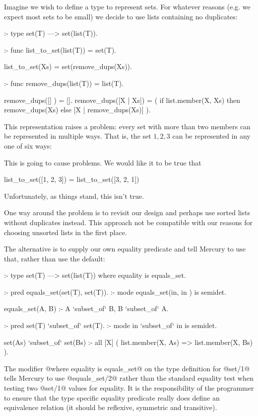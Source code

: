 Imagine we wish to define a type to represent sets.  For whatever reasons
(e.g. we expect most sets to be small) we decide to use lists containing no
duplicates:
\begin{myverbatim}
:- type set(T) ---> set(list(T)).   %

:- func list_to_set(list(T)) = set(T).

list_to_set(Xs) = set(remove_dups(Xs)).

:- func remove_dups(list(T)) = list(T).

remove_dups([]      ) = [].
remove_dups([X | Xs]) =
    ( if list.member(X, Xs) then remove_dups(Xs)
                            else [X | remove_dups(Xs)] ).
\end{myverbatim}
This representation raises a problem: every set with more than two members
can be represented in multiple ways.  That is, the set ${1, 2, 3}$ can be
represented in any one of six ways:
\begin{myverbatim}
    [1, 2, 3]
    [1, 3, 2]
    [2, 1, 3]
    [2, 3, 1]
    [3, 1, 2]
    [3, 2, 1]
\end{myverbatim}
This is going to cause problems.  We would like it to be true that
\begin{myverbatim}
    list_to_set([1, 2, 3]) = list_to_set([3, 2, 1])
\end{myverbatim}
Unfortunately, as things stand, this isn't true.

One way around the problem is to revisit our design and perhaps use sorted
lists without duplicates instead.  This approach not be compatible with our
reasons for choosing unsorted lists in the first place.

The alternative is to supply our own equality predicate and tell Mercury to
use that, rather than use the default:
\begin{myverbatim}
:- type set(T) ---> set(list(T))
    where equality is equals_set.

:- pred equals_set(set(T), set(T)).
:- mode equals_set(in,     in    ) is semidet.

equals_set(A, B) :-
    A `subset_of` B,
    B `subset_of` A.

:- pred set(T) `subset_of` set(T).
:- mode in     `subset_of` in      is semidet.

set(As) `subset_of` set(Bs) :-
    all [X] ( list.member(X, As) => list.member(X, Bs) ).
\end{myverbatim}
The modifier @where equality is equals_set@ on the type definition for
@set/1@ tells Mercury to use @equals_set/2@ rather than the standard
equality test when testing two @set/1@ values for equality.  It is the
responsibility of the programmer to ensure that the type specific equality
predicate really does define an equivalence relation (\ie it should be
reflexive, symmetric and transitive).

